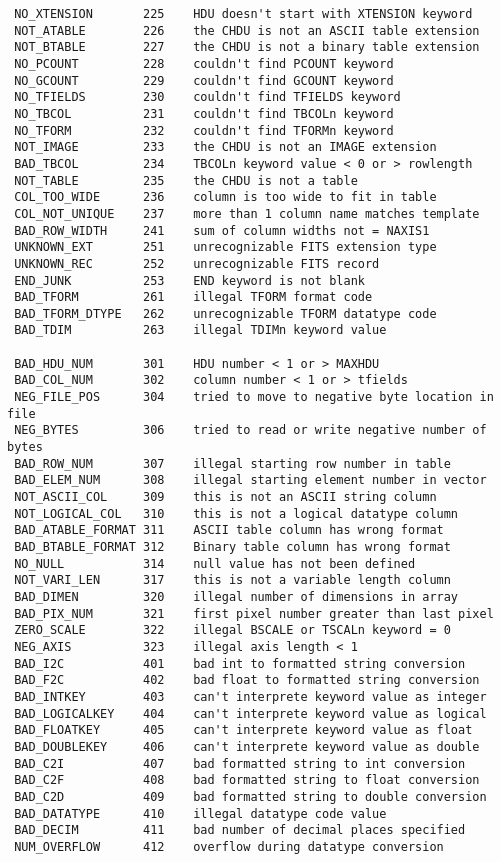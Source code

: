 \begin{verbatim}
 NO_XTENSION       225    HDU doesn't start with XTENSION keyword
 NOT_ATABLE        226    the CHDU is not an ASCII table extension
 NOT_BTABLE        227    the CHDU is not a binary table extension
 NO_PCOUNT         228    couldn't find PCOUNT keyword
 NO_GCOUNT         229    couldn't find GCOUNT keyword
 NO_TFIELDS        230    couldn't find TFIELDS keyword
 NO_TBCOL          231    couldn't find TBCOLn keyword
 NO_TFORM          232    couldn't find TFORMn keyword
 NOT_IMAGE         233    the CHDU is not an IMAGE extension
 BAD_TBCOL         234    TBCOLn keyword value < 0 or > rowlength
 NOT_TABLE         235    the CHDU is not a table
 COL_TOO_WIDE      236    column is too wide to fit in table
 COL_NOT_UNIQUE    237    more than 1 column name matches template
 BAD_ROW_WIDTH     241    sum of column widths not = NAXIS1
 UNKNOWN_EXT       251    unrecognizable FITS extension type
 UNKNOWN_REC       252    unrecognizable FITS record
 END_JUNK          253    END keyword is not blank
 BAD_TFORM         261    illegal TFORM format code
 BAD_TFORM_DTYPE   262    unrecognizable TFORM datatype code
 BAD_TDIM          263    illegal TDIMn keyword value

 BAD_HDU_NUM       301    HDU number < 1 or > MAXHDU
 BAD_COL_NUM       302    column number < 1 or > tfields
 NEG_FILE_POS      304    tried to move to negative byte location in file
 NEG_BYTES         306    tried to read or write negative number of bytes
 BAD_ROW_NUM       307    illegal starting row number in table
 BAD_ELEM_NUM      308    illegal starting element number in vector
 NOT_ASCII_COL     309    this is not an ASCII string column
 NOT_LOGICAL_COL   310    this is not a logical datatype column
 BAD_ATABLE_FORMAT 311    ASCII table column has wrong format
 BAD_BTABLE_FORMAT 312    Binary table column has wrong format
 NO_NULL           314    null value has not been defined
 NOT_VARI_LEN      317    this is not a variable length column
 BAD_DIMEN         320    illegal number of dimensions in array
 BAD_PIX_NUM       321    first pixel number greater than last pixel
 ZERO_SCALE        322    illegal BSCALE or TSCALn keyword = 0
 NEG_AXIS          323    illegal axis length < 1
 BAD_I2C           401    bad int to formatted string conversion
 BAD_F2C           402    bad float to formatted string conversion
 BAD_INTKEY        403    can't interprete keyword value as integer
 BAD_LOGICALKEY    404    can't interprete keyword value as logical
 BAD_FLOATKEY      405    can't interprete keyword value as float
 BAD_DOUBLEKEY     406    can't interprete keyword value as double
 BAD_C2I           407    bad formatted string to int conversion
 BAD_C2F           408    bad formatted string to float conversion
 BAD_C2D           409    bad formatted string to double conversion
 BAD_DATATYPE      410    illegal datatype code value
 BAD_DECIM         411    bad number of decimal places specified
 NUM_OVERFLOW      412    overflow during datatype conversion
\end{verbatim}


